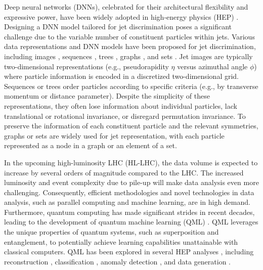 \documentclass[reprint,amsmath,amssymb,prd,nofootinbib]{revtex4-2}
\begin{document}
Deep neural networks (DNNs), celebrated for their architectural flexibility and expressive power, have been widely adopted in high-energy physics (HEP) \cite{hepmllivingreview,hepml1,hepml2}. Designing a DNN model tailored for jet discrimination poses a significant challenge due to the variable number of constituent particles within jets. Various data representations and DNN models have been proposed for jet discrimination, including images \cite{2pcnn,jet_image1,jet_image2,jet_image3,jet_image4,jet_image5,jet_image6,jet_image7}, sequences \cite{jet_seq1,jet_seq2,jet_seq3,jet_seq4,jet_seq5,jet_seq6,jet_seq7}, trees \cite{jet_tree1,jet_tree2}, graphs \cite{jet_graph1,jet_graph2,jet_graph3,jet_graph4,jet_graph5,jet_graph6,jet_graph7,jet_graph8,jet_graph9,jet_graph10,jet_graph11,jet_graph12,jet_graph13}, and sets \cite{pfn,ptcnet,part,jet_set1,jet_set2,jet_set3,jet_set4,jet_set5,jet_set6,jet_set7,jet_set8}. Jet images are typically two-dimensional representations (e.g., pseudorapidity $\eta$ versus azimuthal angle $\phi$) where particle information is encoded in a discretized two-dimensional grid. Sequences or trees order particles according to specific criteria (e.g., by transverse momentum or distance parameter). Despite the simplicity of these representations, they often lose information about individual particles, lack translational or rotational invariance, or disregard permutation invariance. To preserve the information of each constituent particle and the relevant symmetries, graphs or sets are widely used for jet representation, with each particle represented as a node in a graph or an element of a set.

In the upcoming high-luminosity LHC (HL-LHC), the data volume is expected to increase by several orders of magnitude compared to the LHC. The increased luminosity and event complexity due to pile-up will make data analysis even more challenging. Consequently, efficient methodologies and novel technologies in data analysis, such as parallel computing and machine learning, are in high demand. Furthermore, quantum computing has made significant strides in recent decades, leading to the development of quantum machine learning (QML) \cite{qml1,qml2,qml3,qml4,qml5}. QML leverages the unique properties of quantum systems, such as superposition and entanglement, to potentially achieve learning capabilities unattainable with classical computers. QML has been explored in several HEP analyses \cite{qml_hep1}, including reconstruction \cite{qml_reco1,qml_reco2,qml_reco3}, classification \cite{qml_cf1,qml_cf2,qml_cf3,qml_cf4,qml_cf5,qml_cf6,qml_cf7,qml_cf8,qml_cf9,qml_cf10,qml_cf11,qml_cf12,qml_cf13,qml_cf14}, anomaly detection \cite{qml_ad1,qml_ad2,qml_ad3,qml_ad4,qml_ad5}, and data generation \cite{qml_gen1,qml_gen2,qml_gen3,qml_gen4,qml_gen5}.
\end{document}
